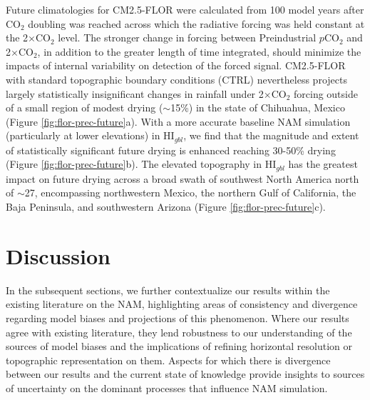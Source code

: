 \documentclass[draft]{agujournal2019}
\begin{document}
Future climatologies for CM2.5-FLOR were calculated from 100 model years after CO$_{2}$ doubling was reached across which the radiative forcing was held constant at the 2$\times$CO$_2$ level. The stronger change in forcing between Preindustrial $p$CO$_2$ and 2$\times$CO$_2$, in addition to the greater length of time integrated, should minimize the impacts of internal variability on detection of the forced signal. CM2.5-FLOR with standard topographic boundary conditions (CTRL) nevertheless projects largely statistically insignificant changes in rainfall under 2$\times$CO$_2$ forcing outside of a small region of modest drying ($\sim$15\%) in the state of Chihuahua, Mexico (Figure \ref{fig:flor-prec-future}a). With a more accurate baseline NAM simulation (particularly at lower elevations) in HI$_{gbl}$, we find that the magnitude and extent of statistically significant future drying is enhanced reaching 30-50\% drying (Figure \ref{fig:flor-prec-future}b). The elevated topography in HI$_{gbl}$ has the greatest impact on future drying across a broad swath of southwest North America north of $\sim$27, encompassing northwestern Mexico, the northern Gulf of California, the Baja Peninsula, and southwestern Arizona (Figure \ref{fig:flor-prec-future}c). 


\section{Discussion}
In the subsequent sections, we further contextualize our results within the existing literature on the NAM, highlighting areas of consistency and divergence regarding model biases and projections of this phenomenon. Where our results agree with existing literature, they lend robustness to our understanding of the sources of model biases and the implications of refining horizontal resolution or topographic representation on them. Aspects for which there is divergence between our results and the current state of knowledge provide insights to sources of uncertainty on the dominant processes that influence NAM simulation.

\end{document}
